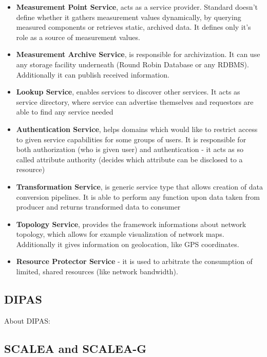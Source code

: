 \begin{itemize}
\item{ {\bf Measurement Point Service}, acts as a service provider. Standard doesn\rq{}t define whether it gathers measurement values dynamically, by querying measured components or retrieves static, archived data. It defines only it\rq{}s role as a source of measurement values. }
\item{ {\bf Measurement Archive Service}, is responsible for archivization. It can use any storage facility underneath (Round Robin Database or any RDBMS). Additionally it can publish received information. }
\item{ {\bf Lookup Service}, enables services to discover other services. It acts as service directory, where service can advertise themselves and requestors are able to find any service needed}
\item{ {\bf Authentication Service}, helps domains which would like to restrict access to given service capabilities for some groups of users. It is responsible for both authorization (who is given user) and authentication - it acts as so called attribute authority (decides which attribute can be disclosed to a resource)}
\item{ {\bf Transformation Service}, is generic service type that allows creation of data conversion pipelines. It is able to perform any function upon data taken from producer and returns transformed data to consumer}
\item{ {\bf Topology Service}, provides the framework informations about network topology, which allows for example visualization of network maps. Additionally it gives information on geolocation, like GPS coordinates.}
\item{ {\bf Resource Protector Service} - it is used to arbitrate the consumption of limited, shared resources (like network bandwidth).}
\end{itemize}

\subsection{DIPAS}

About DIPAS: \cite{DIPAS}

\subsection{SCALEA and SCALEA-G}

